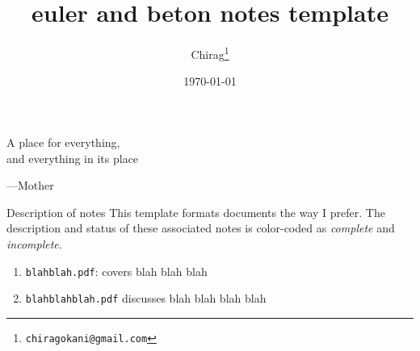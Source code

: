 \documentclass[12pt]{article}
\title{\textsf{euler} and \textsf{beton} notes template}
\author{Chirag\footnote{\texttt{chiragokani@gmail.com}}} %
\date{\today}
\numberwithin{equation}{section}
\begin{document}
\maketitle
\setlength{\epigraphwidth}{0.31\textwidth}
\epigraph{\Fontlukas A place for everything,\\and everything in its place}{\Fontlukas---Mother}
\iffalse
\begin{tcbraster}[raster columns=3,raster rows=1,raster height= 5.2cm, raster width= \linewidth,
  enhanced,size=small,arc=2mm,colframe=gray!65!black,
  colback=gray!10!white,watermark overzoom=1,fit algorithm=hybrid* ]
\begin{tcolorbox}[rounded corners=northwest,boxrule=0pt,
watermark graphics=lightning.jpeg]\end{tcolorbox} %
\begin{tcolorbox}\textit{you can insert some text here with pictures on either side...}\end{tcolorbox}
\begin{tcolorbox}[rounded corners=northeast,boxrule=0pt,
watermark graphics=jet.jpeg]\end{tcolorbox}
\end{tcbraster}
\fi
\begin{graytext}{Description of notes}
This template formats documents the way I prefer. The description and status of these associated notes is color-coded as \color{cyan}\textit{complete} \color{black} and  \color{magenta}\textit{incomplete}\color{black}.
\begin{enumerate}[label=(\alph*)]
\item \color{cyan}\texttt{blahblah.pdf}: covers blah blah blah \color{black} 
\item \color{magenta}\texttt{blahblahblah.pdf} discusses blah blah blah blah \color{black} 
\end{enumerate}
\end{graytext}
\tableofcontents
\end{document}
